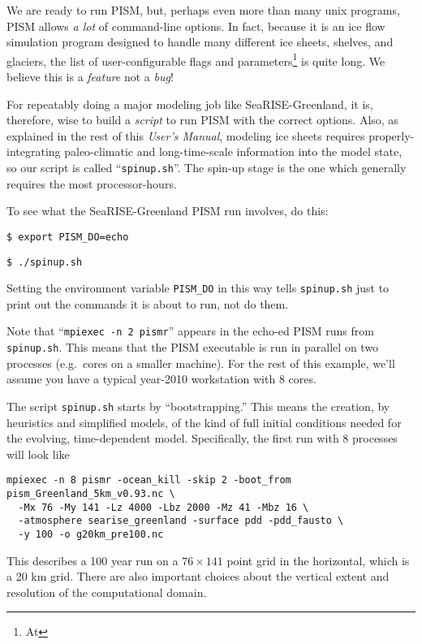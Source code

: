 We are ready to run PISM, but, perhaps even more than many unix programs, PISM allows \emph{a lot} of command-line options.  In fact, because it is an ice flow simulation program designed to handle many different ice sheets, shelves, and glaciers, the list of user-configurable flags and parameters\footnote{At }
is quite long.  We believe this is a \emph{feature} not a \emph{bug}!

For repeatably doing a major modeling job like SeaRISE-Greenland, it is, therefore, wise to build a \emph{script} to run PISM with the correct options.  Also, as explained in the rest of this \emph{User's Manual}, modeling ice sheets requires properly-integrating paleo-climatic and long-time-scale information into the model state, so our script is called ``\verb|spinup.sh|''.  The spin-up stage is the one which generally requires the most processor-hours.

To see what the SeaRISE-Greenland PISM run involves, do this:

\verb|$ export PISM_DO=echo|

\verb+$ ./spinup.sh+

\noindent Setting the environment variable \verb|PISM_DO| in this way tells \verb|spinup.sh| just to print out the commands it is about to run, not do them.

Note that ``\verb|mpiexec -n 2 pismr|'' appears in the echo-ed PISM runs from \verb|spinup.sh|.  This means that the PISM executable is run in parallel on two processes (e.g.~cores on a smaller machine).  For the rest of this example, we'll assume you have a typical year-2010 workstation with 8 cores.

The script \verb|spinup.sh| starts by ``bootstrapping.''  This means the creation, by heuristics and simplified models, of the kind of full initial conditions needed for the evolving, time-dependent model.  Specifically, the first run with 8 processes will look like
\begin{verbatim}
mpiexec -n 8 pismr -ocean_kill -skip 2 -boot_from pism_Greenland_5km_v0.93.nc \
  -Mx 76 -My 141 -Lz 4000 -Lbz 2000 -Mz 41 -Mbz 16 \
  -atmosphere searise_greenland -surface pdd -pdd_fausto \
  -y 100 -o g20km_pre100.nc
\end{verbatim}
This describes a 100 year run on a $76\times 141$ point grid in the horizontal, which is a 20 km grid.  There are also important choices about the vertical extent and resolution of the computational domain.



